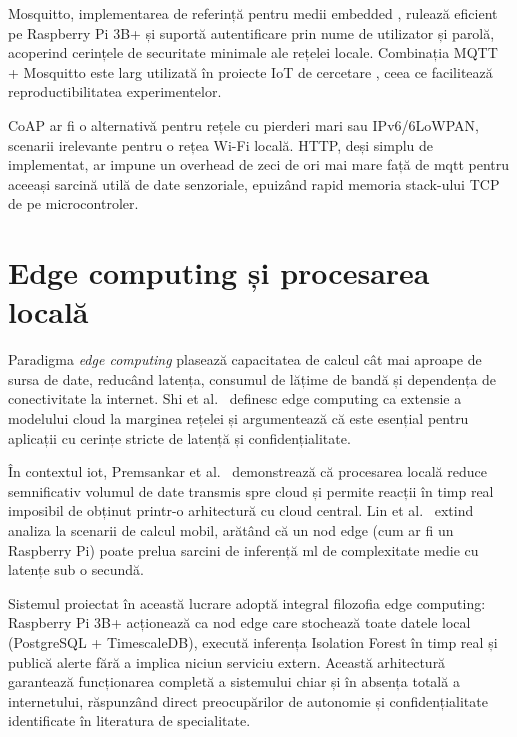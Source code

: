 Mosquitto, implementarea de referință pentru medii embedded \cite{light2017mosquitto},
rulează eficient pe Raspberry Pi 3B+ și suportă autentificare prin nume de utilizator și
parolă, acoperind cerințele de securitate minimale ale rețelei locale. Combinația MQTT +
Mosquitto este larg utilizată în proiecte IoT de cercetare \cite{naik2017mqttcomparison},
ceea ce facilitează reproductibilitatea experimentelor.

CoAP ar fi o alternativă pentru rețele cu pierderi mari sau IPv6/6LoWPAN, scenarii
irelevante pentru o rețea Wi-Fi locală. HTTP, deși simplu de implementat, ar impune un
overhead de zeci de ori mai mare față de \gls{mqtt} pentru aceeași sarcină utilă de date
senzoriale, epuizând rapid memoria stack-ului TCP de pe microcontroler.

\section{Edge computing și procesarea locală}
\label{sec:studii-edge}

Paradigma \emph{edge computing} plasează capacitatea de calcul cât mai aproape de sursa
de date, reducând latența, consumul de lățime de bandă și dependența de conectivitate la
internet. Shi et al.\ \cite{shi2016edge} definesc edge computing ca extensie a modelului
cloud la marginea rețelei și argumentează că este esențial pentru aplicații cu cerințe
stricte de latență și confidențialitate.

În contextul \gls{iot}, Premsankar et al.\ \cite{premsankar2018edgeiot} demonstrează că
procesarea locală reduce semnificativ volumul de date transmis spre cloud și permite
reacții în timp real imposibil de obținut printr-o arhitectură cu cloud central. Lin et
al.\ \cite{lin2017edge} extind analiza la scenarii de calcul mobil, arătând că un nod
edge (cum ar fi un Raspberry Pi) poate prelua sarcini de inferență \gls{ml} de complexitate
medie cu latențe sub o secundă.

Sistemul proiectat în această lucrare adoptă integral filozofia edge computing: Raspberry
Pi 3B+ acționează ca nod edge care stochează toate datele local (PostgreSQL + TimescaleDB),
execută inferența Isolation Forest în timp real și publică alerte fără a implica niciun
serviciu extern. Această arhitectură garantează funcționarea completă a sistemului chiar
și în absența totală a internetului, răspunzând direct preocupărilor de autonomie și
confidențialitate identificate în literatura de specialitate.

